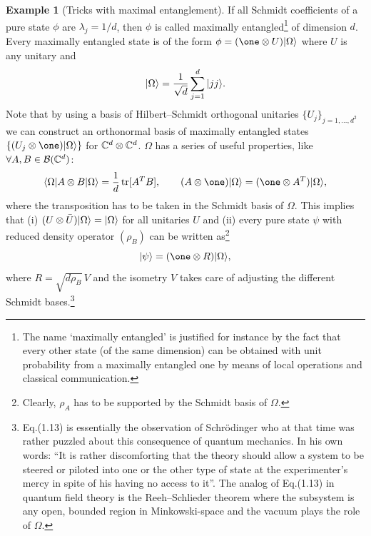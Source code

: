 \documentclass[11pt,a4paper]{article}
\theoremstyle{plain}
\theoremstyle{definition}
\newtheorem{example}{Example}[section]
\theoremstyle{remark}
\numberwithin{equation}{section}
\begin{document}
\begin{example}[Tricks with maximal entanglement]
    If all Schmidt coefficients of a pure state $\phi$ are $\lambda_j=1/d$, then $\phi$ is called maximally entangled\footnote{The name `maximally entangled' is justified for instance by the fact that every other state (of the same dimension) can be obtained with unit probability from a maximally entangled one by means of local operations and classical communication.} of dimension $d$. Every maximally entangled state is of the form $\phi=(\one\otimes U)\ket{\Omega}$ where $U$ is any unitary and
    \begin{equation}
        |\Omega\rangle=\frac{1}{\sqrt{d}}\sum_{j=1}^{d} |jj\rangle.
    \end{equation}
    Note that by using a basis of Hilbert--Schmidt orthogonal unitaries $\{U_j\}_{j=1,\dots,d^2}$ we can construct an orthonormal basis of maximally entangled states $\{(U_j\otimes \one)\ket{\Omega}\}$ for $\mathbb{C}^d\otimes \mathbb{C}^d$. $\Omega$ has a series of useful properties, like $\forall A,B\in \mathcal{B}(\mathbb{C}^d)$:
    \begin{equation}
        \bra{\Omega}A\otimes B\ket{\Omega}=\frac{1}{d}\tr[A^T B],
        \qquad
        (A\otimes \one)\ket{\Omega} = (\one\otimes A^T)\ket{\Omega},
    \end{equation}
    where the transposition has to be taken in the Schmidt basis of $\Omega$. This implies that (i) $(U\otimes \bar{U})|\Omega\rangle=|\Omega\rangle$ for all unitaries $U$ and (ii) every pure state $\psi$ with reduced density operator $(\rho_B)$ can be written as\footnote{Clearly, $\rho_A$ has to be supported by the Schmidt basis of $\Omega$.}
    \begin{equation}
        \ket{\psi} = (\one\otimes R)\ket{\Omega},
    \end{equation}
    where $R=\sqrt{d\rho_B}\,V$ and the isometry $V$ takes care of adjusting the different Schmidt bases.\footnote{Eq.(1.13) is essentially the observation of Schr\"odinger who at that time was rather puzzled about this consequence of quantum mechanics. In his own words: ``It is rather discomforting that the theory should allow a system to be steered or piloted into one or the other type of state at the experimenter's mercy in spite of his having no access to it''. The analog of Eq.(1.13) in quantum field theory is the Reeh--Schlieder theorem where the subsystem is any open, bounded region in Minkowski-space and the vacuum plays the role of $\Omega$.}


\end{example}
\end{document}

